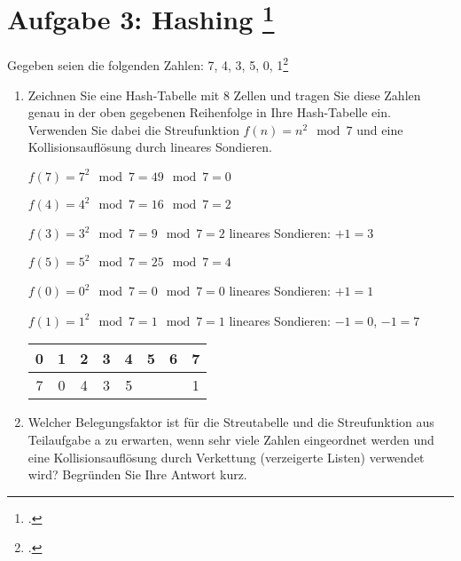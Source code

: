\documentclass{lehramt-informatik-minimal}
\begin{document}
\section{Aufgabe 3: Hashing
\footcite[Seite 2]{aud:pu:5}
}

Gegeben seien die folgenden Zahlen: 7, 4, 3, 5, 0, 1\footcite[Frühjahr
2005, Thema 2, A 8]{examen:66112:2005:03}

\begin{enumerate}


\item Zeichnen Sie eine Hash-Tabelle mit 8 Zellen und tragen Sie diese
Zahlen genau in der oben gegebenen Reihenfolge in Ihre Hash-Tabelle ein.
Verwenden Sie dabei die Streufunktion $f(n) = n^2 \mod 7$ und eine
Kollisionsauflösung durch lineares Sondieren.

\begin{antwort}
{
\footnotesize
$f(7) = 7^2 \mod 7 = 49 \mod 7 = 0$

$f(4) = 4^2 \mod 7 = 16 \mod 7 = 2$

$f(3) = 3^2 \mod 7 = 9 \mod 7 = 2$ lineares Sondieren: $+1 = 3$

$f(5) = 5^2 \mod 7 = 25 \mod 7 = 4$

$f(0) = 0^2 \mod 7 = 0 \mod 7 = 0$ lineares Sondieren: $+1 = 1$

$f(1) = 1^2 \mod 7 = 1 \mod 7 = 1$ lineares Sondieren: $-1 = 0$, $-1 = 7$
}

\begin{tabular}{|c|c|c|c|c|c|c|c|}
\hline
0 & 1 & 2 & 3 & 4 & 5 & 6 & 7 \\\hline
7 & 0 & 4 & 3 & 5 &   &   & 1 \\\hline
\end{tabular}

\end{antwort}


\item Welcher Belegungsfaktor ist für die Streutabelle und die
Streufunktion aus Teilaufgabe a zu erwarten, wenn sehr viele Zahlen
eingeordnet werden und eine Kollisionsauflösung durch Verkettung
(verzeigerte Listen) verwendet wird? Begründen Sie Ihre Antwort kurz.

\end{enumerate}
\end{document}
